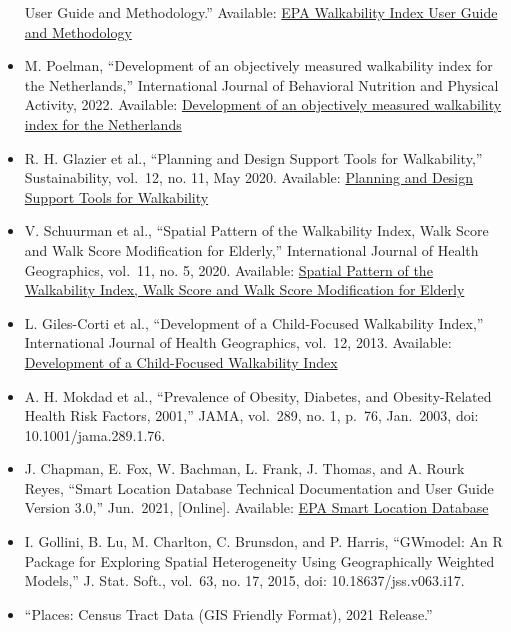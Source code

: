 \documentclass[
]{article}
\begin{document}
\begin{itemize}
  User Guide and Methodology.'' Available:
  \href{https://www.epa.gov/smartgrowth/national-walkability-index-user-guide-and-methodology}{EPA
  Walkability Index User Guide and Methodology}
\item
  M. Poelman, ``Development of an objectively measured walkability index
  for the Netherlands,'' International Journal of Behavioral Nutrition
  and Physical Activity, 2022. Available:
  \href{https://ijbnpa.biomedcentral.com/articles/10.1186/s12966-022-01270-8}{Development
  of an objectively measured walkability index for the Netherlands}
\item
  R. H. Glazier et al., ``Planning and Design Support Tools for
  Walkability,'' Sustainability, vol.~12, no. 11, May 2020. Available:
  \href{https://www.mdpi.com/2071-1050/12/11/4405}{Planning and Design
  Support Tools for Walkability}
\item
  V. Schuurman et al., ``Spatial Pattern of the Walkability Index, Walk
  Score and Walk Score Modification for Elderly,'' International Journal
  of Health Geographics, vol.~11, no. 5, 2020. Available:
  \href{https://www.mdpi.com/2220-9964/11/5/279}{Spatial Pattern of the
  Walkability Index, Walk Score and Walk Score Modification for Elderly}
\item
  L. Giles-Corti et al., ``Development of a Child-Focused Walkability
  Index,'' International Journal of Health Geographics, vol.~12, 2013.
  Available:
  \href{https://ij-healthgeographics.biomedcentral.com/articles/10.1186/1476-072X-12-61}{Development
  of a Child-Focused Walkability Index}
\item
  A. H. Mokdad et al., ``Prevalence of Obesity, Diabetes, and
  Obesity-Related Health Risk Factors, 2001,'' JAMA, vol.~289, no. 1,
  p.~76, Jan.~2003, doi: 10.1001/jama.289.1.76.
\item
  J. Chapman, E. Fox, W. Bachman, L. Frank, J. Thomas, and A. Rourk
  Reyes, ``Smart Location Database Technical Documentation and User
  Guide Version 3.0,'' Jun.~2021, {[}Online{]}. Available:
  \href{https://www.epa.gov/system/files/documents/2023-10/epa_sld_3.0_technicaldocumentationuserguide_may2021_0.pdf}{EPA
  Smart Location Database}
\item
  I. Gollini, B. Lu, M. Charlton, C. Brunsdon, and P. Harris, ``GWmodel:
  An R Package for Exploring Spatial Heterogeneity Using Geographically
  Weighted Models,'' J. Stat. Soft., vol.~63, no. 17, 2015, doi:
  10.18637/jss.v063.i17.
\item
  ``Places: Census Tract Data (GIS Friendly Format), 2021 Release.''

\end{itemize}
\end{document}
